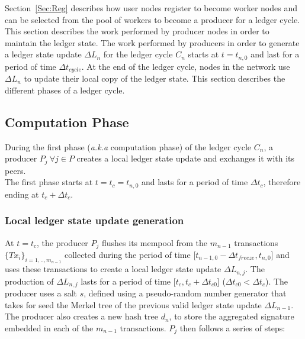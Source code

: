 Section~\ref{Sec:Reg} describes how user nodes register to become worker nodes and can be selected from the pool of workers to become a producer for a ledger cycle. This section describes the work performed by producer nodes in order to maintain the ledger state. The work performed by producers in order to generate a ledger state update $\Delta L_n$ for the ledger cycle $C_n$ starts at $t=t_{n,0}$ and last for a period of time $\Delta t_{cycle}$. At the end of the ledger cycle, nodes in the network use $\Delta L_n$ to update their local copy of the ledger state. This section describes the different phases of a ledger cycle. 


\subsection{Computation Phase}
\label{subsec:comp}

During the first phase (\textit{a.k.a} computation phase) of the ledger cycle $C_n$, a producer $P_j~\forall j \in P$ creates a local ledger state update and exchanges it with its peers.\\

The first phase starts at $t = t_c = t_{n,0}$ and lasts for a period of time $\Delta t_{c}$, therefore ending at $t_c+\Delta t_{c}$.

\subsubsection{Local ledger state update generation}

At $t = t_c$, the producer $P_j$ flushes its mempool from the $m_{n-1}$ transactions $\{Tx_i\}_{i=1,..,m_{n-1}}$ collected during the period of time [$t_{n-1,0} - \Delta t_{freeze}, t_{n,0}$] and uses these transactions to create a local ledger state update $\Delta L_{n,j}$. 
The production of $\Delta L_{n,j}$ lasts for a period of time [$t_c, t_c+ \Delta t_{c0}$] ($\Delta t_{c0} < \Delta t_{c}$). The producer uses a salt $s$, defined using a pseudo-random number generator that takes for seed the Merkel tree of the previous valid ledger state update $\Delta L_{n-1}$. The producer also creates a new hash tree $d_n$, to store the aggregated signature embedded in each of the $m_{n-1}$ transactions. $P_j$ then follows a series of steps: 

